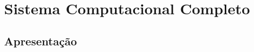 \documentclass[../delivery_hospital_report.tex]{subfiles}
\begin{document}
\chapter{Sistema Computacional Completo}
\section{Apresentação}
\end{document}
